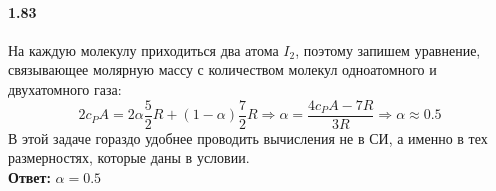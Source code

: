 \documentclass{article}
\begin{document}
\paragraph{1.83}
\par На каждую молекулу приходиться два атома $I_{2}$, поэтому запишем уравнение, связывающее молярную массу с количеством молекул одноатомного и двухатомного газа:
\begin{displaymath}
2c_{P}A=2\alpha\frac52R + (1-\alpha)\frac72R\Rightarrow \alpha=\frac{4c_{P}A-7R}{3R}\Rightarrow \alpha\approx0.5
\end{displaymath}
В этой задаче гораздо удобнее проводить вычисления не в СИ, а именно в тех размерностях, которые даны в условии.\\
\textbf{Ответ:} $\alpha=0.5$
\end{document}
